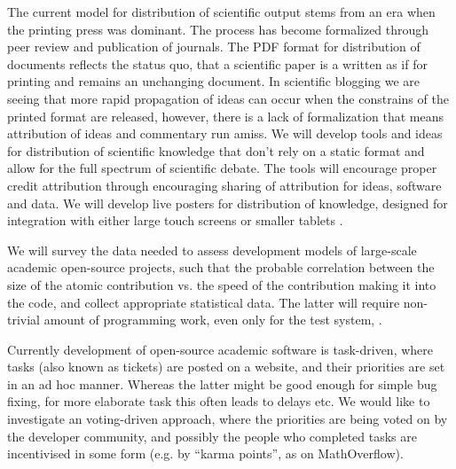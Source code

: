 \begin{workpackage}[id=social-aspects,wphases=0-48,
  title=Social Aspects,
  lead=UO,
  UORM=53,USHRM=8, USORM=5]
\begin{tasklist}
\begin{task}[title=Modern Distribution of Scientific Output]
   The current model for distribution of scientific output
  stems from an era when the printing press was dominant. The process has become
  formalized through peer review and publication of journals. The PDF format for
  distribution of documents reflects the status quo, that a scientific paper is a written
  as if for printing and remains an unchanging document. In scientific blogging we are
  seeing that more rapid propagation of ideas can occur when the constrains of the printed
  format are released, however, there is a lack of formalization that means attribution of
  ideas and commentary run amiss. We will develop tools and ideas for distribution of
  scientific knowledge that don't rely on a static format and allow for the full spectrum
  of scientific debate. The tools will encourage proper credit attribution through
  encouraging sharing of attribution for ideas, software and data. We will develop live
  posters for distribution of knowledge, designed for integration with either large touch
  screens or smaller tablets .
\end{task}

\begin{task}[title=Survey and collection of needed data,id=datacollection]
We will survey the data needed to assess development models of
large-scale academic open-source projects,
such that the probable correlation between the size of the atomic contribution
vs. the speed of the contribution making it into the code,
and collect appropriate statistical data. The latter will require non-trivial
amount of programming work, even only for the test system, \Sage.
\end{task}

\begin{task}[title=Collective decision making in development,id=decisionmaking]
Currently development of open-source academic software is task-driven, where tasks (also
known as tickets) are posted on a website, and their priorities are set in an ad hoc manner.
Whereas the latter might be good enough for simple bug fixing, for more elaborate task this
often leads to delays etc.
We would like to investigate an voting-driven approach, where the priorities are being
voted on by the developer community, and possibly the people who completed tasks
are incentivised in some form (e.g. by ``karma points'', as on MathOverflow).
\end{task}


\end{tasklist}
\end{workpackage}
